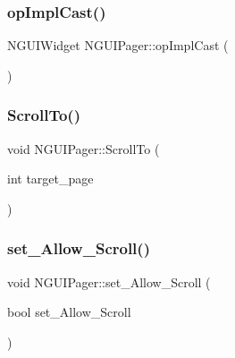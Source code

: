 \hypertarget{class_n_g_u_i_pager_acf4f6f0b723eea350bc49cf5df6b5353}{}\label{class_n_g_u_i_pager_acf4f6f0b723eea350bc49cf5df6b5353} 
\subsubsection{\texorpdfstring{op\+Impl\+Cast()}{opImplCast()}}
{\footnotesize\ttfamily N\+G\+U\+I\+Widget N\+G\+U\+I\+Pager\+::op\+Impl\+Cast (\begin{DoxyParamCaption}{ }\end{DoxyParamCaption})}

\hypertarget{class_n_g_u_i_pager_aacc4ab035a55752564bd3d38087ba3a6}{}\label{class_n_g_u_i_pager_aacc4ab035a55752564bd3d38087ba3a6} 
\subsubsection{\texorpdfstring{Scroll\+To()}{ScrollTo()}}
{\footnotesize\ttfamily void N\+G\+U\+I\+Pager\+::\+Scroll\+To (\begin{DoxyParamCaption}\item[{int}]{target\+\_\+page }\end{DoxyParamCaption})}

\hypertarget{class_n_g_u_i_pager_a781d9c02a767b9b0ae026c1a02848c73}{}\label{class_n_g_u_i_pager_a781d9c02a767b9b0ae026c1a02848c73} 
\subsubsection{\texorpdfstring{set\+\_\+\+Allow\+\_\+\+Scroll()}{set\_Allow\_Scroll()}}
{\footnotesize\ttfamily void N\+G\+U\+I\+Pager\+::set\+\_\+\+Allow\+\_\+\+Scroll (\begin{DoxyParamCaption}\item[{bool}]{set\+\_\+\+Allow\+\_\+\+Scroll }\end{DoxyParamCaption})}

\hypertarget{class_n_g_u_i_pager_ab7273128c03dd292f8e647f65d8d882b}{}\label{class_n_g_u_i_pager_ab7273128c03dd292f8e647f65d8d882b} 
